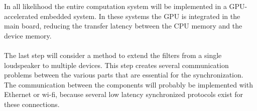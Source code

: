 In all likelihood the entire computation system will be implemented in a GPU-accelerated embedded system. In these systems the GPU is integrated in the main board, reducing the transfer latency between the CPU memory and the device memory.\\\\
The last step will consider a method to extend the filters from a single loudspeaker to multiple devices. This step creates several communication problems between the various parts that are essential for the synchronization.\\
The communication between the components will probably be implemented with Ethernet or wi-fi, because several low latency synchronized protocols exist for these connections.
